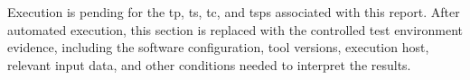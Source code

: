 Execution is pending for the \gls{tp}, \gls{ts}, \gls{tc}, and \glspl{tsp}
associated with this report.  After automated execution, this section is
replaced with the controlled test environment evidence, including the software
configuration, tool versions, execution host, relevant input data, and other
conditions needed to interpret the results.

